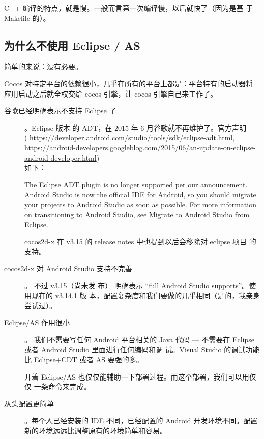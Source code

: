 \documentclass[a4paper, 10pt]{article}
\begin{document}
C++ 编译的特点，就是慢。一般而言第一次编译慢，以后就快了（因为是基
于 Makefile 的）。

\subsection{为什么不使用 Eclipse / AS}

简单的来说：没有必要。

Cocos 对特定平台的依赖很小，几乎在所有的平台上都是：平台特有的启动器将
应用启动之后就全权交给 cocos 引擎，让 cocos 引擎自己来工作了。

\begin{description}
\item [谷歌已经明确表示不支持 Eclipse 了]。Eclipse 版本
  的 ADT，在 2015 年 6 月谷歌就不再维护了。官方声明\\(
  \url{https://developer.android.com/studio/tools/sdk/eclipse-adt.html},\\
  \url{https://android-developers.googleblog.com/2015/06/an-update-on-eclipse-android-developer.html})\\
  如下：

  \begin{shaded}
    The Eclipse ADT plugin is no longer supported per our
    announcement. Android Studio is now the official IDE for Android,
    so you should migrate your projects to Android Studio as soon as
    possible. For more information on transitioning to Android Studio,
    see Migrate to Android Studio from Eclipse.
  \end{shaded}

  cocos2d-x 在 v3.15 的 release notes 中也提到以后会移除对 eclipse 项目
  的支持。
  
\item [cocos2d-x 对 Android Studio 支持不完善]。 不过 v3.15（尚未发
  布） 明确表示 ``full Android Studio supports''。使用现在的 v3.14.1 版
  本，配置复杂度和我们要做的几乎相同（是的，我亲身尝试过）。
  
\item [Eclipse/AS 作用很小]。 我们不需要写任何 Android 平台相关的 Java
  代码 --- 不需要在 Eclipse 或者 Android Studio 里面进行任何编码和调
  试。Visual Studio 的调试功能比 Eclipse+CDT 或者 AS 要强的多。

  开着 Eclipse/AS 也仅仅能辅助一下部署过程。而这个部署，我们可以用仅仅
  一条命令来完成。
  
\item [从头配置更简单]。每个人已经安装的 IDE 不同，已经配置的 Android
  开发环境不同。配置新的环境远远比调整原有的环境简单和容易。
\end{description}
\end{document}
